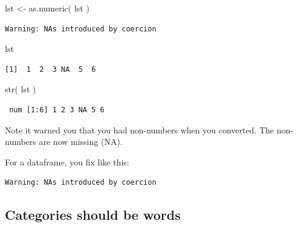 \documentclass[
  letterpaper,
  DIV=11,
  numbers=noendperiod]{scrreprt}
\newenvironment{Shaded}{\begin{snugshade}}{\end{snugshade}}
\newcommand{\FunctionTok}[1]{\textcolor[rgb]{0.02,0.16,0.49}{#1}}
\newcommand{\NormalTok}[1]{\textcolor[rgb]{0.00,0.44,0.13}{#1}}
\newcommand{\OtherTok}[1]{\textcolor[rgb]{0.00,0.44,0.13}{#1}}
\newcommand{\SpecialCharTok}[1]{\textcolor[rgb]{0.25,0.44,0.63}{#1}}
\begin{document}
\begin{Shaded}
\begin{Highlighting}[]
\NormalTok{lst }\OtherTok{\textless{}{-}} \FunctionTok{as.numeric}\NormalTok{( lst )}
\end{Highlighting}
\end{Shaded}

\begin{verbatim}
Warning: NAs introduced by coercion
\end{verbatim}

\begin{Shaded}
\begin{Highlighting}[]
\NormalTok{lst}
\end{Highlighting}
\end{Shaded}

\begin{verbatim}
[1]  1  2  3 NA  5  6
\end{verbatim}

\begin{Shaded}
\begin{Highlighting}[]
\FunctionTok{str}\NormalTok{( lst )}
\end{Highlighting}
\end{Shaded}

\begin{verbatim}
 num [1:6] 1 2 3 NA 5 6
\end{verbatim}

Note it warned you that you had non-numbers when you converted. The
non-numbers are now missing (NA).

For a dataframe, you fix like this:

\begin{Shaded}
\end{Shaded}

\begin{verbatim}
Warning: NAs introduced by coercion
\end{verbatim}

\hypertarget{categories-should-be-words}{%
\subsection{Categories should be
words}\label{categories-should-be-words}}
\end{document}
